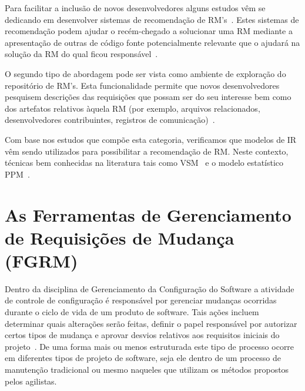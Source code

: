 Para facilitar a inclusão de novos desenvolvedores alguns estudos vêm se
dedicando em desenvolver sistemas de recomendação de
RM's~\cite{malheiros2012source, Wang2011bug}. Estes sistemas de recomendação
podem ajudar o recém-chegado a solucionar uma RM mediante a apresentação de
outras de código fonte potencialmente relevante que o ajudará na solução da RM
do qual ficou responsável~\cite{malheiros2012source}.

O segundo tipo de abordagem pode ser vista como ambiente de exploração do
repositório de RM's.  Esta funcionalidade permite que novos desenvolvedores
pesquisem descrições das requisições que possam ser do seu interesse bem como
dos artefatos relativos àquela RM (por exemplo, arquivos relacionados,
desenvolvedores contribuintes, registros de comunicação)~\cite{Wang2011bug}.

Com base nos estudos que compõe esta categoria, verificamos que modelos de IR
vêm sendo utilizados para possibilitar a recomendação de RM\@. Neste contexto,
técnicas bem conhecidas na literatura tais como VSM~\cite{Wang2011bug} e o
modelo estatístico PPM~\cite{malheiros2012source}.
\section{As Ferramentas de Gerenciamento de Requisições de Mudança (FGRM)}
\label{sec:ferramentas_de_gerenciamento_requisicoes_de_mudanca}

Dentro da disciplina de Gerenciamento da Configuração do Software a atividade de
controle de configuração é responsável por gerenciar mudanças ocorridas durante
o ciclo de vida de um produto de software. Tais ações incluem determinar quais
alterações serão feitas, definir o papel responsável por autorizar certos tipos
de mudança e aprovar desvios relativos aos requisitos iniciais do
projeto~\cite{4425813}. De uma forma mais ou menos estruturada este tipo de
processo ocorre em diferentes tipos de projeto de software, seja ele dentro de
um processo de manutenção tradicional ou mesmo naqueles que utilizam os métodos
propostos pelos agilistas.

